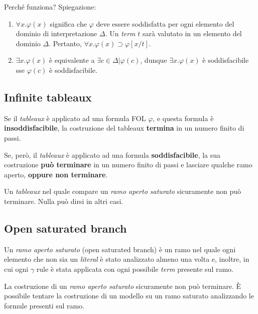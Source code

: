 Perché funziona? Spiegazione:
\begin{enumerate}
\item $\forall x . \varphi(x)$ significa che $\varphi$ deve essere soddisfatta per ogni elemento del dominio di interpretazione $\Delta$. Un \textit{term} $t$ sarà valutato in un elemento del dominio $\Delta$. Pertanto, $\forall x. \varphi(x) \supset \varphi[x/t]$.
\item $\exists x. \varphi(x)$ è equivalente a $\exists c \in \Delta | \varphi(c)$, dunque $\exists x. \varphi(x)$ è soddisfacibile sse $\varphi(c)$ è soddisfacibile.
\end{enumerate}

\vspace{1em}

\subsection{Infinite tableaux}
Se il \textit{tableaux} è applicato ad una formula FOL $\varphi$, e questa formula è \textbf{insoddisfacibile}, la costruzione del tableaux \textbf{termina} in un numero finito di passi.

Se, però, il \textit{tableaux} è applicato ad una formula \textbf{soddisfacibile}, la sua costruzione \textbf{può terminare} in un numero finito di passi e lasciare qualche ramo aperto, \textbf{oppure non terminare}.

Un \textit{tableaux} nel quale compare un \textit{ramo aperto saturato} sicuramente non può terminare. Nulla può dirsi in altri casi.

\subsection{Open saturated branch}
Un \textit{ramo aperto saturato} (open saturated branch) è un ramo nel quale ogni elemento che non sia un \textit{literal} è stato analizzato almeno una volta e, inoltre, in cui ogni $\gamma$ rule è stata applicata con ogni possibile \textit{term} presente sul ramo.

La costruzione di un \textit{ramo aperto saturato} sicuramente non può terminare. È possibile tentare la costruzione di un modello su un ramo saturato analizzando le formule presenti sul ramo.